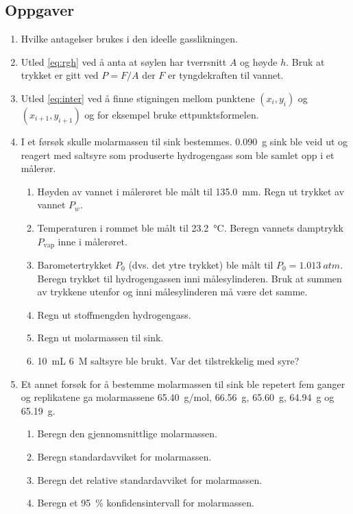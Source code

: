 	\subsection{Oppgaver}
	\begin{enumerate}[label=\alph*)]
		\item Hvilke antagelser brukes i den ideelle gasslikningen.
		
		\item Utled \vref{eq:rgh} ved å anta at søylen har tverrsnitt $A$ og høyde $h$. Bruk at trykket er gitt ved $P=F/A$ der $F$ er tyngdekraften til vannet.	
		
		\item Utled \vref{eq:inter} ved å finne stigningen mellom punktene $(x_i, y_i)$ og $(x_{i+1}, y_{i+1})$ og for eksempel bruke ettpunktsformelen. 
		
		\item I et førsøk skulle molarmassen til sink bestemmes. \SI{0.090}{g} sink ble veid ut og reagert med saltsyre som produserte hydrogengass som ble samlet opp i et målerør.
		\begin{enumerate}[label=\roman*)]
			\item Høyden av vannet i målerøret ble målt til \SI{135.0}{mm}. Regn ut trykket av vannet $P_w$.
			
			\item Temperaturen i rommet ble målt til \SI{23.2}{\celsius}. Beregn vannets damptrykk $P_\mathrm{vap}$ inne i målerøret.
			
			\item Barometertrykket $P_0$ (dvs. det ytre trykket) ble målt til $P_0=\SI{1.013}{atm}$. Beregn trykket til hydrogengassen inni målesylinderen. Bruk at summen av trykkene utenfor og inni målesylinderen må være det samme.
			
			\item Regn ut stoffmengden hydrogengass. 
			
			\item Regn ut molarmassen til sink.
			
			\item \SI{10}{mL} \SI{6}{M} saltsyre ble brukt. Var det tilstrekkelig med syre?
		\end{enumerate}
	
		\item Et annet forsøk for å bestemme molarmassen til sink ble repetert fem ganger og replikatene ga molarmassene \SI{65,40}{g/mol}, \SI{66,56}{g}, \SI{65,60}{g}, \SI{64,94}{g} og \SI{65,19}{g}.
		\begin{enumerate}[label=\roman*)]
			\item Beregn den gjennomsnittlige molarmassen.
			
			\item Beregn standardavviket for molarmassen.
			
			\item Beregn det relative standardavviket for molarmassen.
			
			\item Beregn et \SI{95}{\percent} konfidensintervall for molarmassen.
		\end{enumerate}
		
	\end{enumerate}
	
